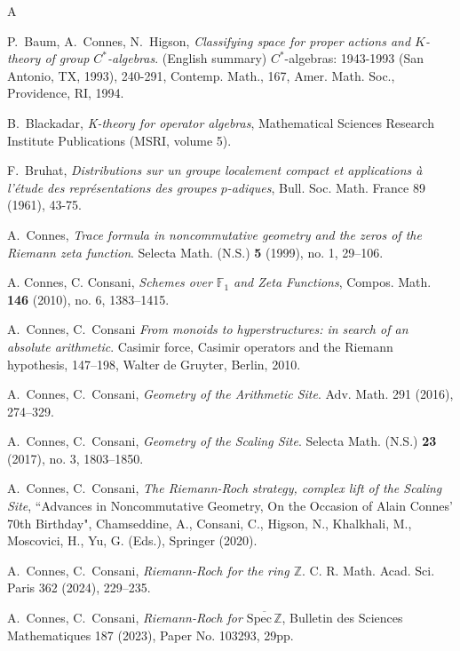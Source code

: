\documentclass[letterpaper,11pt]{article}
\def\Z{\mathbb{Z}}
\theoremstyle{plain}
\begin{document}
 \begin{thebibliography}{A}


   P.~Baum, A.~Connes, N.~Higson,  \emph{ Classifying space for proper actions and $K$-theory of group
$C^*$-algebras}. (English summary)
$C^*$-algebras: 1943-1993 (San Antonio, TX, 1993), 240-291, Contemp. Math., 167, Amer. Math. Soc., Providence, RI, 1994.

   B.~Blackadar, {\em K-theory for operator algebras}, Mathematical Sciences Research Institute Publications (MSRI, volume 5).

    F.~Bruhat, {\em Distributions sur un groupe localement compact et applications à l'étude des représentations des groupes $p$-adiques}, Bull. Soc. Math. France 89 (1961), 43-75.
 
 A.~Connes, \emph{Trace formula in noncommutative geometry and the zeros of the Riemann zeta function}.  Selecta Math. (N.S.)  \textbf{5}  (1999),  no. 1, 29--106.


 A. Connes, C. Consani, \emph{Schemes over $\mathbb F_1$ and Zeta Functions}, Compos. Math. \textbf{146} (2010), no. 6, 1383--1415.
 
  A.~Connes, C.~Consani  {\em  From monoids to hyperstructures: in search of an absolute arithmetic}. Casimir force, Casimir operators and the Riemann hypothesis, 147--198, Walter de Gruyter, Berlin, 2010.



 A.~Connes, C.~Consani, {\em Geometry of the Arithmetic Site}. Adv. Math. 291 (2016), 274--329.

 A.~Connes, C.~Consani, \emph{Geometry of the Scaling Site}.  Selecta Math. (N.S.) \textbf{23} (2017), no. 3, 1803--1850.

 A.~Connes, C.~Consani, \emph{The Riemann-Roch strategy, complex lift of the Scaling Site},  ``Advances in Noncommutative Geometry, On the Occasion of Alain Connes' 70th Birthday", Chamseddine, A., Consani, C., Higson, N., Khalkhali, M., Moscovici, H., Yu, G. (Eds.), Springer (2020). 

 A.~Connes, C.~Consani, \emph{Riemann-Roch for the ring $\Z$}. C. R. Math. Acad. Sci. Paris 362 (2024), 229–235.

 A.~Connes, C.~Consani, \emph{Riemann-Roch for $\overline{\text{Spec}\,\Z}$}, Bulletin des Sciences Mathematiques 187 (2023), Paper No. 103293, 29pp.


\end{thebibliography}
\end{document}
